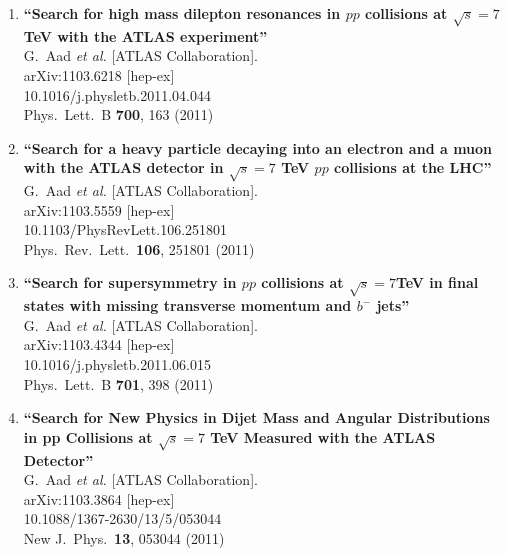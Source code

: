 \documentclass{article}
\begin{document}
\begin{enumerate}
\item%
{\bf ``Search for high mass dilepton resonances in $pp$ collisions at $\sqrt{s}=7$ TeV with the ATLAS experiment''}
  \\{}G.~Aad {\it et al.}  [ATLAS Collaboration].
  \\{}arXiv:1103.6218 [hep-ex]
    \\{}10.1016/j.physletb.2011.04.044
\\{}Phys.\ Lett.\ B {\bf 700}, 163 (2011) %


\item%
{\bf ``Search for a heavy particle decaying into an electron and a muon with the ATLAS detector in $\sqrt{s}=7$ TeV $pp$ collisions at the LHC''}
  \\{}G.~Aad {\it et al.}  [ATLAS Collaboration].
  \\{}arXiv:1103.5559 [hep-ex]
    \\{}10.1103/PhysRevLett.106.251801
\\{}Phys.\ Rev.\ Lett.\  {\bf 106}, 251801 (2011) %


\item%
{\bf ``Search for supersymmetry in $pp$ collisions at $\sqrt{s}=7$TeV in final states with missing transverse momentum and $b^-$ jets''}
  \\{}G.~Aad {\it et al.}  [ATLAS Collaboration].
  \\{}arXiv:1103.4344 [hep-ex]
    \\{}10.1016/j.physletb.2011.06.015
\\{}Phys.\ Lett.\ B {\bf 701}, 398 (2011) %


\item%
{\bf ``Search for New Physics in Dijet Mass and Angular Distributions in pp Collisions at $\sqrt{s} = 7$ TeV Measured with the ATLAS Detector''}
  \\{}G.~Aad {\it et al.}  [ATLAS Collaboration].
  \\{}arXiv:1103.3864 [hep-ex]
    \\{}10.1088/1367-2630/13/5/053044
\\{}New J.\ Phys.\  {\bf 13}, 053044 (2011) %



\end{enumerate}
\end{document}

